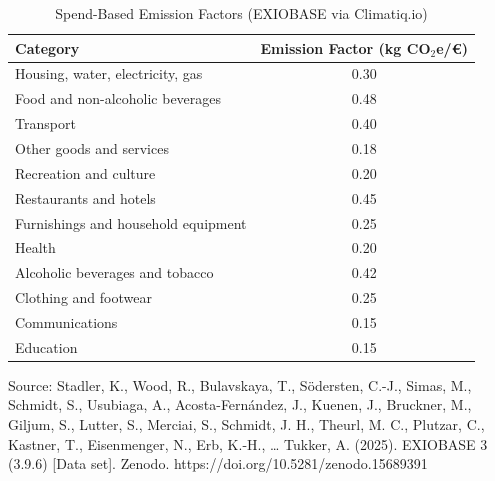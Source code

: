 \documentclass[12pt,a4paper]{article}%
\begin{document}
\begin{table}[H]
\captionsetup{justification=raggedright,singlelinecheck=false} 
\caption{Spend-Based Emission Factors (EXIOBASE via Climatiq.io)}\label{tab:efactors}
\begin{tabular}{l S[table-format=1.2]}
\toprule
\textbf{Category} & {\textbf{Emission Factor (kg CO$_2$e/€)}} \\
\midrule
Housing, water, electricity, gas & 0.30 \\
Food and non-alcoholic beverages & 0.48 \\
Transport & 0.40 \\
Other goods and services & 0.18 \\
Recreation and culture & 0.20 \\
Restaurants and hotels & 0.45 \\
Furnishings and household equipment & 0.25 \\
Health & 0.20 \\
Alcoholic beverages and tobacco & 0.42 \\
Clothing and footwear & 0.25 \\
Communications & 0.15 \\
Education & 0.15 \\
\bottomrule
\end{tabular}
\raggedright
\vspace{0.3cm}

\footnotesize{Source: Stadler, K., Wood, R., Bulavskaya, T., Södersten, C.-J., Simas, M., Schmidt, S., Usubiaga, A., Acosta-Fernández, J., Kuenen, J., Bruckner, M., Giljum, S., Lutter, S., Merciai, S., Schmidt, J. H., Theurl, M. C., Plutzar, C., Kastner, T., Eisenmenger, N., Erb, K.-H., … Tukker, A. (2025). EXIOBASE 3 (3.9.6) [Data set]. Zenodo. https://doi.org/10.5281/zenodo.15689391
}
\end{table}
\end{document}
